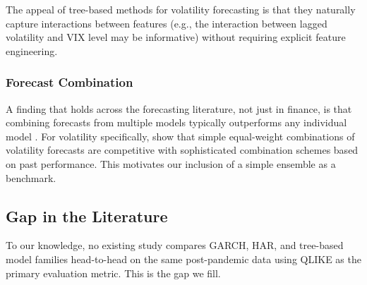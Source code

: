 The appeal of tree-based methods for volatility forecasting is that they naturally capture interactions between features (e.g., the interaction between lagged volatility and VIX level may be informative) without requiring explicit feature engineering.

\subsubsection{Forecast Combination}

A finding that holds across the forecasting literature, not just in finance, is that combining forecasts from multiple models typically outperforms any individual model \citep{Timmermann2006}. For volatility specifically, \citet{Patton2019} show that simple equal-weight combinations of volatility forecasts are competitive with sophisticated combination schemes based on past performance. This motivates our inclusion of a simple ensemble as a benchmark.

\subsection{Gap in the Literature}

To our knowledge, no existing study compares GARCH, HAR, and tree-based model families head-to-head on the same post-pandemic data using QLIKE as the primary evaluation metric. This is the gap we fill.
